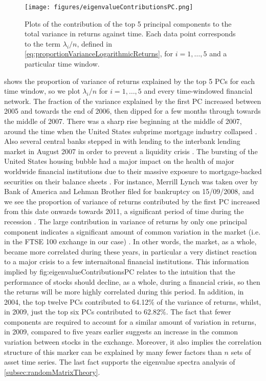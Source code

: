\begin{figure}
	\centering
	\texttt{[image: figures/eigenvalueContributionsPC.png]}
	\caption[Plots of the contribution of the top 5 principal components to the total variance in returns against time.]{\label{fig:eigenvalueContributionsPC} Plots of the contribution of the top 5 principal components to the total variance in returns against time. Each data point corresponds to the term $\lambda_{i}/n$, defined in \cref{eq:proportionVarianceLogarithmicReturns}, for $i=1,\dots,5$ and a particular time window.}
\end{figure}

 shows the proportion of variance of returns explained by the top 5 PCs for each time window, so we plot $\lambda_{i}/n$ for $i=1,\dots,5$ and every time-windowed financial network.
The fraction of the variance explained by the first PC increased between 2005 and towards the end of 2006, then dipped for a few months through towards the middle of 2007.
There was a sharp rise beginning at the middle of 2007, around the time when the United States subprime mortgage industry collapsed \cite{GrWik}.
Also several central banks stepped in with lending to the interbank lending market in August 2007 in order to prevent a liquidity crisis \cite{GrWik}.
The bursting of the United States housing bubble had a major impact on the health of major worldwide financial institutions due to their massive exposure to mortgage-backed securities on their balance sheets \cite{GrWik}.
For instance, Merrill Lynch was taken over by Bank of America and Lehman Brother filed for bankruptcy on 15/09/2008, and we see the proportion of variance of returns contributed by the first PC increased from this date onwards towards 2011, a significant period of time during the recession \cite{FPW+11,GrWik}.
The large contribution in variance of returns by only one principal component indicates a significant amount of common variation in the market (i.e. in the FTSE 100 exchange in our case) \cite{FPW+11}.
In other words, the market, as a whole, became more correlated during these years, in particular a very distinct reaction to a major crisis to a few internaitonal financial institutions.
This information implied by {fig:eigenvalueContributionsPC} relates to the intuition that the performance of stocks should decline, as a whole, during a financial crisis, so then the returns will be more highly correlated during this period.
In addition, in 2004, the top twelve PCs contributed to 64.12\% of the variance of returns, whilst, in 2009, just the top six PCs contributed to 62.82\%.
The fact that fewer components are required to account for a similar amount of variation in returns, in 2009, compared to five years earlier suggests an increase in the common variation between stocks in the exchange.
Moreover, it also implies the correlation structure of this marker can be explained by many fewer factors than $n$ sets of asset time series.
The last fact supports the eigenvalue spectra analysis of \cref{subsec:randomMatrixTheory}.
